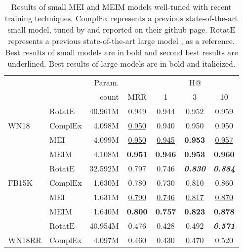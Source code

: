 \documentclass{ecai}
\theoremstyle{plain}  \newtheorem{thm}{Theorem}  \newtheorem{lem}[thm]{Lemma}  \newtheorem{prop}[thm]{Proposition}
\theoremstyle{remark}  \newtheorem*{rem}{Remark}
\begin{document}
\begin{table}\begin{center}
		\caption{Results of small MEI \cite{tran_multipartitionembeddinginteraction_2020} and MEIM \cite{tran_meimmultipartitionembedding_2022} models well-tuned with recent training techniques. ComplEx represents a previous state-of-the-art small model, tuned by \cite{lacroix_canonicaltensordecomposition_2018} and reported on their github page. RotatE represents a previous state-of-the-art large model \cite{sun_rotateknowledgegraph_2019}, as a reference. Best results of small models are in bold and second best results are underlined. Best results of large models are in bold and italicized.}
		\label{tab:result_tuned_small}
		
		\begin{adjustbox}{max width=\columnwidth}
			\begin{tabular}{@{\extracolsep{-3.5pt}}llrcccc}
				\toprule
				& & Param. & & \multicolumn{3}{c}{H@} \\
				& & count & MRR & 1 & 3 & 10 \\
\midrule
				
				& RotatE & 40.961M & 0.949 & 0.944 & 0.952 & 0.959 \\ \cmidrule{3-7}
				\multirow{1}{*}{WN18} & ComplEx & 4.098M & \underline{0.950} & 0.940 & 0.950 & 0.950 \\
				
				& MEI & 4.099M & \underline{0.950} & \underline{0.945} & \textbf{0.953} & \underline{0.957} \\ & MEIM & 4.108M & \textbf{0.951} & \textbf{0.946} & \textbf{0.953} & \textbf{0.960} \\ \midrule
				\midrule
				
				& RotatE & 32.592M & 0.797 & 0.746 & \textit{\textbf{0.830}} & \textit{\textbf{0.884}} \\ \cmidrule{3-7}
				\multirow{1}{*}{FB15K} & ComplEx & 1.630M & 0.780 & 0.730 & 0.810 & 0.860 \\
				
				& MEI & 1.631M & \underline{0.790} & \underline{0.746} & \underline{0.817} & \underline{0.870} \\ & MEIM & 1.640M & \textbf{0.800} & \textbf{0.757} & \textbf{0.823} & \textbf{0.878} \\ \midrule
				\midrule
				
				
				& RotatE & 40.954M & 0.476 & 0.428 & 0.492 & \textit{\textbf{0.571}} \\ \cmidrule{3-7}
				\multirow{1}{*}{WN18RR} & ComplEx & 4.097M & 0.460 & 0.430 & 0.470 & 0.520 \\
				

\end{tabular}
\end{adjustbox}
\end{center}
\end{table}
\end{document}

